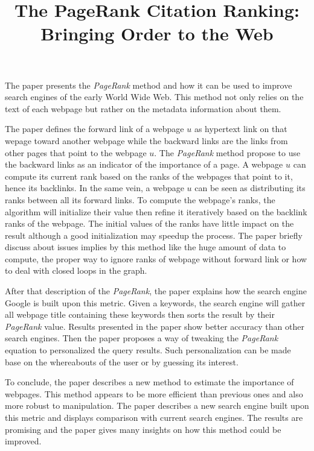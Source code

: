 \documentclass{article}
\title{The PageRank Citation Ranking: Bringing Order to the Web}
\begin{document}
\maketitle
The paper presents the \textit{PageRank} method
and how it can be used to improve search engines
of the early World Wide Web. This method not
only relies on the text of each webpage but
rather on the metadata information about them.

The paper defines the forward link of a webpage $u$
as hypertext link on that wepage toward another webpage while the
backward links are the links from other pages that
point to the webpage $u$. The \textit{PageRank}
method propose to use the backward links as an
indicator of the importance of a page.
A webpage $u$ can compute its current rank based
on the ranks of the webpages that point to it,
hence its backlinks. In the same vein, a webpage
$u$ can be seen as distributing its ranks between all
its forward links.
To compute the webpage's ranks, the algorithm
will initialize their value then refine
it iteratively based on the backlink ranks of the webpage. 
The initial values of the ranks have little
impact on the result although a good
initialization may speedup the process.
The paper briefly discuss about issues implies by
this method like the huge amount of data to
compute, the proper way to ignore ranks of
webpage without forward link or how to deal with
closed loops in the graph.

After that description of the \textit{PageRank},
the paper explains how the search engine Google is
built upon this metric. Given a keywords, the
search engine will gather all webpage title
containing these keywords then sorts the result by
their \textit{PageRank} value.
Results presented in the paper show better
accuracy than other search engines.
Then the paper proposes a way of tweaking the
\textit{PageRank} equation to personalized the
query results. Such personalization can be made
base on the whereabouts of the user or by guessing
its interest.

To conclude, the paper describes a new method to
estimate the importance of webpages. This method
appears to be more efficient than previous ones
and also more robust to manipulation. The paper
describes a new search engine built upon this
metric and displays comparison with current search
engines. The results are promising and the paper
gives many insights on how this method could be
improved.

\end{document}
